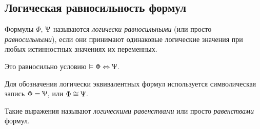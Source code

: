 \subsection*{Логическая равносильность формул}
\begin{definition}
    Формулы $\Phi$, $\Uppsi$ называются \textit{логически равносильными} (или просто \textit{равносильными}), если они принимают одинаковые логические значения при любых истинностных значениях их переменных.

    Это равносильно условию $\vDash\Phi\Leftrightarrow\Uppsi$.
\end{definition}

\begin{definition}
    Для обозначения логически эквивалентных формул используется символическая запись $\Phi = \Uppsi$, или $\Phi \cong \Uppsi$.

    Такие выражения называют \textit{логическими равенствами} или просто \textit{равенствами} формул.
\end{definition}

